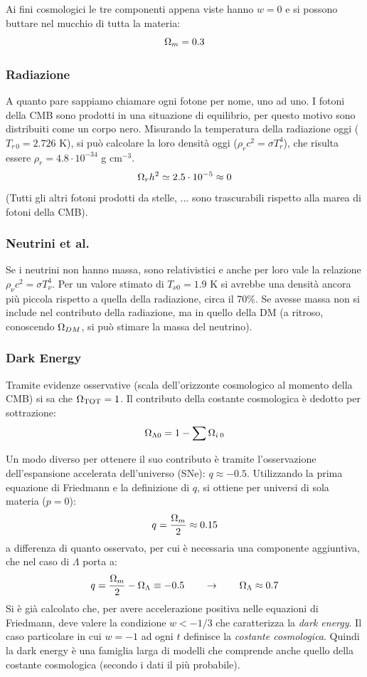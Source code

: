 Ai fini cosmologici le tre componenti appena viste hanno $w=0$ e si possono buttare nel mucchio di tutta la materia:
\begin{equation}
    \Omega_{m}= 0.3
\end{equation}

\subsubsection{Radiazione}
A quanto pare sappiamo chiamare ogni fotone per nome, uno ad uno. I fotoni della CMB sono prodotti in una situazione di equilibrio, per questo motivo sono distribuiti come un corpo nero. Misurando la temperatura della radiazione oggi ($T_{r\, 0}=2.726$ K), si può calcolare la loro densità oggi ($\rho_r c^2 = \sigma T_r^4$), che risulta essere $\rho_r=4.8\cdot 10^{-34}$ g cm$^{-3}$.
\begin{equation}
    \Omega_{r} h^2\simeq 2.5\cdot 10^{-5}\approx 0
\end{equation}
(Tutti gli altri fotoni prodotti da stelle, ... sono trascurabili rispetto alla marea di fotoni della CMB).

\subsubsection{Neutrini et al.}
Se i neutrini non hanno massa, sono relativistici e anche per loro vale la relazione $\rho_\nu c^2 = \sigma T_\nu^4$. Per un valore stimato di $T_{\nu 0}=1.9$ K si avrebbe una densità ancora più piccola rispetto a quella della radiazione, circa il 70\%. Se avesse massa non si include nel contributo della radiazione, ma in quello della DM (a ritroso, conoscendo $\Omega_{DM}$, si può stimare la massa del neutrino).

\subsubsection{Dark Energy}
Tramite evidenze osservative (scala dell'orizzonte cosmologico al momento della CMB) si sa che $\Omega_{\mathrm{TOT}}=1$.
Il contributo della costante cosmologica è dedotto per sottrazione:
\begin{equation}
    \Omega_{\Lambda 0} = 1 - \sum \Omega_{i\: 0}
\end{equation}

Un modo diverso per ottenere il suo contributo è tramite l'osservazione dell'espansione accelerata dell'universo (SNe): $q \approx -0.5$. Utilizzando la prima equazione di Friedmann e la definizione di $q$, si ottiene per universi di sola materia ($p=0$):
$$
q = \frac{\Omega_{m}}{2}\approx 0.15
$$
a differenza di quanto osservato, per cui è necessaria una componente aggiuntiva, che nel caso di $\Lambda$ porta a:
$$
q = \frac{\Omega_{m}}{2} -\Omega_\Lambda \equiv -0.5 \qquad\rightarrow\qquad \Omega_\Lambda \approx 0.7
$$
Si è già calcolato che, per avere accelerazione positiva nelle equazioni di Friedmann, deve valere la condizione $w< -1/3$ che caratterizza la \textit{dark energy}. Il caso particolare in cui $w=-1$ ad ogni $t$ definisce la \textit{costante cosmologica}. Quindi la dark energy è una famiglia larga di modelli che comprende anche quello della costante cosmologica (secondo i dati il più probabile).


